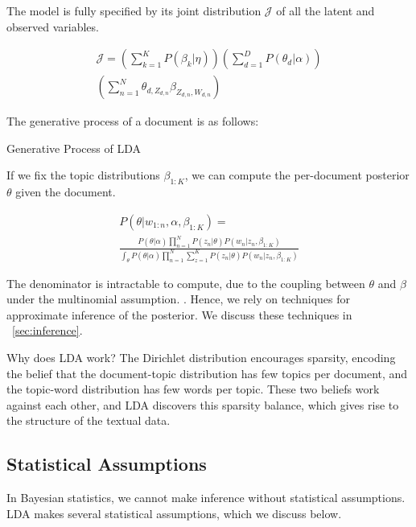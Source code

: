\documentclass[letterpaper]{article}
\begin{document}
The model is fully specified by its joint distribution $\mathcal{J}$
of all the latent and observed variables.

\begin{multline}
 \mathcal{J} = \left( \sum_{k=1}^{K} P(\beta_k | \eta) \right) \left(
    \sum_{d=1}^{D} P(\theta_d | \alpha) \right) \\
  \left( \sum_{n=1}^{N} \theta_{d, Z_{d,n}} \beta_{Z_{d,n}, W_{d,n}} \right)  
\end{multline}

The generative process of a document is as follows:

\begin{algorithm}
  \caption{Generative Process of LDA}\label{alg:LDA}
  \begin{algorithmic}[1]
    \EndFor
    \EndFor
  \end{algorithmic}
\end{algorithm}

If we fix the topic distributions $\beta_{1:K}$, we can compute the
per-document posterior $\theta$ given the document.

\begin{multline}
  P(\theta | w_{1:n}, \alpha, \beta_{1:K}) = \\ \frac{P(\theta |
    \alpha)\prod_{n=1}^{N} P(z_n | \theta) P(w_n | z_n,
    \beta_{1:K})}{\int_\theta P(\theta | \alpha) \prod_{n=1}^N
    \sum_{z=1}^K P(z_n | \theta) P(w_n | z_n, \beta_{1:K})}
\end{multline}


The denominator is intractable to compute, due to the coupling
between $\theta$ and $\beta$ under the multinomial assumption.
\cite{blei2003latent}. Hence, we rely on techniques for approximate
inference of the posterior. We discuss these techniques in
~\autoref{sec:inference}.

Why does LDA work? The Dirichlet distribution encourages sparsity,
encoding the belief that the document-topic distribution has few
topics per document, and the topic-word distribution has few words per
topic. These two beliefs work against each other, and LDA discovers
this sparsity balance, which gives rise to the structure of the
textual data.

\subsection{Statistical Assumptions}
\label{subsec:statistical-assumptions}
In Bayesian statistics, we cannot make inference without statistical
assumptions. LDA makes several statistical assumptions, which we
discuss below.
\end{document}
